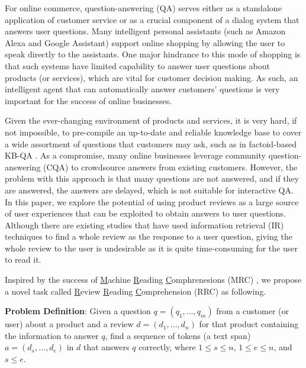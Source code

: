 For online commerce, question-answering (QA) serves either as a standalone application of customer service or as a crucial component of a dialog system that answers user questions.
Many intelligent personal assistants (such as Amazon Alexa and Google Assistant) support online shopping by allowing the user to speak directly to the assistants. 
One major hindrance to this mode of shopping is that such systems have limited capability to answer user questions about products (or services), which are vital for customer decision making.
As such, an intelligent agent that can automatically answer customers' questions is very important for the success of online businesses.

Given the ever-changing environment of products and services, it is very hard, if not impossible, to pre-compile an up-to-date and reliable knowledge base to cover a wide assortment of questions that customers may ask, such as in factoid-based KB-QA \cite{xu2016question,fader2014open,kwok2001scaling,yin2015neural}.
As a compromise, many online businesses leverage community question-answering (CQA) \cite{mcauley2016addressing} to crowdsource answers from existing customers. However, the problem with this approach is that many questions are not answered, and if they are answered, the answers are delayed, which is not suitable for interactive QA.
In this paper, we explore the potential of using product reviews as a large source of user experiences that can be exploited to obtain answers to user questions. Although there are existing studies that have used information retrieval (IR) techniques \cite{mcauley2016addressing,yu2018aware} to find a whole review as the response to a user question, giving the whole review to the user is undesirable as it is quite time-consuming for the user to read it.

Inspired by the success of \underline{M}achine \underline{R}eading \underline{C}omphrenesions (MRC) \cite{rajpurkar2016squad,rajpurkar2018know}, we propose a novel task called \underline{R}eview \underline{R}eading \underline{C}omprehension (RRC) as following.

\textbf{Problem Definition}: Given a question $q=(q_1, \dots, q_m)$ from a customer (or user) about a product and a review $d=(d_1, \dots, d_n)$ for that product containing the information to answer $q$, find a sequence of tokens (a text span) $a=(d_s, \dots, d_e)$ in $d$ that answers $q$ correctly, where $1 \le s \le n$, $1\le e \le n$, and $s\le e$.

